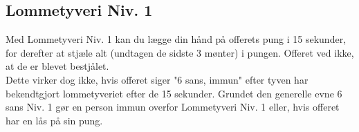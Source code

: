 \subsection*{Lommetyveri Niv. 1}
Med Lommetyveri Niv. 1 kan du lægge din hånd på offerets pung i 15 sekunder, for derefter at stjæle alt (undtagen de sidste 3 mønter) i pungen. Offeret ved ikke, at de er blevet bestjålet. \\
Dette virker dog ikke, hvis offeret siger "6 sans, immun" efter tyven har bekendtgjort lommetyveriet efter de 15 sekunder. Grundet den generelle evne 6 sans Niv. 1 gør en person immun overfor Lommetyveri Niv. 1 eller, hvis offeret har en lås på sin pung.